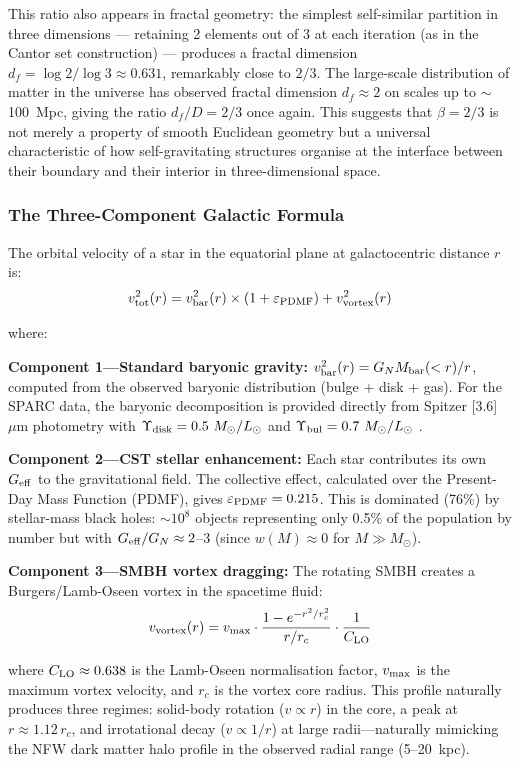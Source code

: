 \documentclass[10pt,a4paper]{article}
\begin{document}
This ratio also appears in fractal geometry: the simplest self-similar partition in three dimensions --- retaining 2 elements out of 3 at each iteration (as in the Cantor set construction) --- produces a fractal dimension $d_f = \log 2/\log 3 \approx 0.631$, remarkably close to $2/3$. The large-scale distribution of matter in the universe has observed fractal dimension $d_f \approx 2$ on scales up to $\sim$100~Mpc, giving the ratio $d_f/D = 2/3$ once again. This suggests that $\beta = 2/3$ is not merely a property of smooth Euclidean geometry but a universal characteristic of how self-gravitating structures organise at the interface between their boundary and their interior in three-dimensional space.

\subsubsection{The Three-Component Galactic Formula}

The orbital velocity of a star in the equatorial plane at galactocentric distance $r$ is:
\[v_{\rm tot}^2(r) = v_{\rm bar}^2(r) \times (1 + \varepsilon_{\rm PDMF}) + v_{\rm vortex}^2(r)\]

where:

\textbf{Component 1---Standard baryonic gravity:} $v_{\rm bar}^2(r) = G_N M_{\rm bar}(<r)/r$, computed from the observed baryonic distribution (bulge + disk + gas). For the SPARC data, the baryonic decomposition is provided directly from Spitzer [3.6]~$\mu$m photometry with $\Upsilon_{\rm disk} = 0.5~M_\odot/L_\odot$ and $\Upsilon_{\rm bul} = 0.7~M_\odot/L_\odot$ \cite{Schombert2019}.

\textbf{Component 2---CST stellar enhancement:} Each star contributes its own $G_{\rm eff}$ to the gravitational field. The collective effect, calculated over the Present-Day Mass Function (PDMF), gives $\varepsilon_{\rm PDMF} = 0.215$. This is dominated (76\%) by stellar-mass black holes: $\sim 10^8$ objects representing only 0.5\% of the population by number but with $G_{\rm eff}/G_N \approx 2$--3 (since $w(M) \approx 0$ for $M \gg M_\odot$).

\textbf{Component 3---SMBH vortex dragging:} The rotating SMBH creates a Burgers/Lamb-Oseen vortex in the spacetime fluid:
\[v_{\rm vortex}(r) = v_{\rm max} \cdot \frac{1 - e^{-r^2/r_c^2}}{r/r_c} \cdot \frac{1}{C_{\rm LO}}\]

where $C_{\rm LO} \approx 0.638$ is the Lamb-Oseen normalisation factor, $v_{\rm max}$ is the maximum vortex velocity, and $r_c$ is the vortex core radius. This profile naturally produces three regimes: solid-body rotation ($v \propto r$) in the core, a peak at $r \approx 1.12\,r_c$, and irrotational decay ($v \propto 1/r$) at large radii---naturally mimicking the NFW dark matter halo profile in the observed radial range (5--20~kpc).
\end{document}
